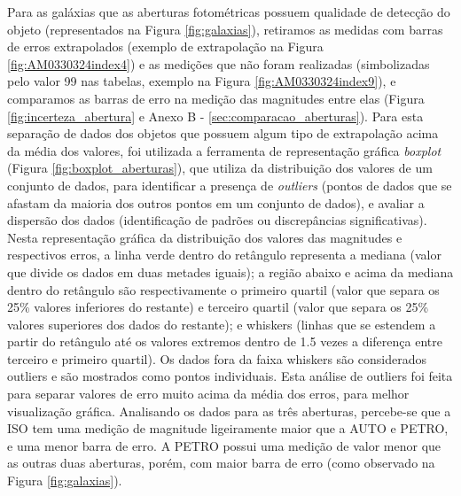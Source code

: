 Para as galáxias que as aberturas fotométricas possuem qualidade de detecção do objeto (representados na Figura \ref{fig:galaxias}), retiramos as medidas com barras de erros extrapolados (exemplo de extrapolação na Figura \ref{fig:AM0330324index4}) e as medições que não foram realizadas (simbolizadas pelo valor 99 nas tabelas, exemplo na Figura \ref{fig:AM0330324index9}), e comparamos as barras de erro na medição das magnitudes entre elas (Figura \ref{fig:incerteza_abertura} e Anexo B - \ref{sec:comparacao_aberturas}). Para esta separação de dados dos objetos que possuem algum tipo de extrapolação acima da média dos valores, foi utilizada a ferramenta de representação gráfica \emph{boxplot} (Figura \ref{fig:boxplot_aberturas}), que utiliza da distribuição dos valores de um conjunto de dados, para identificar a presença de \emph{outliers} (pontos de dados que se afastam da maioria dos outros pontos em um conjunto de dados), e avaliar a dispersão dos dados (identificação de padrões ou discrepâncias significativas). Nesta representação gráfica da distribuição dos valores das magnitudes e respectivos erros, a linha verde dentro do retângulo representa a mediana (valor que divide os dados em duas metades iguais); a região abaixo e acima da mediana dentro do retângulo são respectivamente o primeiro quartil (valor que separa os 25\% valores inferiores do restante) e terceiro quartil (valor que separa os 25\% valores superiores dos dados do restante); e whiskers (linhas que se estendem a partir do retângulo até os valores extremos dentro de 1.5 vezes a diferença entre terceiro e primeiro quartil). Os dados fora da faixa whiskers são considerados outliers e são mostrados como pontos individuais. Esta análise de outliers foi feita para separar valores de erro muito acima da média dos erros, para melhor visualização gráfica. Analisando os dados para as três aberturas, percebe-se que a ISO tem uma medição de magnitude ligeiramente maior que a AUTO e PETRO, e uma menor barra de erro. A PETRO possui uma medição de valor menor que as outras duas aberturas, porém, com maior barra de erro (como observado na Figura \ref{fig:galaxias}).

